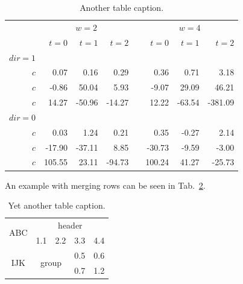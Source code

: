 \begin{table}[!htb]
  \caption{Another table caption.}
  \label{tab:multipleColumns}
  \centering
  \renewcommand{\arraystretch}{1.2} %
  \begin{tabular}{@{}rrrrcrrr@{}} %
    \toprule
      & \multicolumn{3}{c}{$w = 2$} & \phantom{abc} & \multicolumn{3}{c}{$w = 4$} \\
    \cmidrule{2-4}
    \cmidrule{6-8}
      & $t=0$ & $t=1$ & $t=2$ && $t=0$ & $t=1$ & $t=2$ \\
    \midrule
      $dir=1$
      \\
      $c$ &  0.07 &  0.16 &  0.29 &&  0.36 &  0.71 &   3.18 \\
      $c$ & -0.86 & 50.04 &  5.93 && -9.07 & 29.09 &  46.21 \\
      $c$ & 14.27 &-50.96 &-14.27 && 12.22 &-63.54 &-381.09 \\
      $dir=0$
      \\
      $c$ &  0.03 &  1.24 &  0.21 &&  0.35 & -0.27 &  2.14 \\
      $c$ &-17.90 &-37.11 &  8.85 &&-30.73 & -9.59 & -3.00 \\
      $c$ &105.55 & 23.11 &-94.73 &&100.24 & 41.27 &-25.73 \\
    \bottomrule
  \end{tabular}
\end{table}

An example with merging rows can be seen in Tab.~\ref{tab:multipleRows}.

\begin{table}[!htb]
  \caption{Yet another table caption.}
  \label{tab:multipleRows}
  \renewcommand{\arraystretch}{1.2} %
  \centering
  \begin{tabular}{ccccc}
    \toprule
      \multirow{2}{*}{ABC} & \multicolumn{4}{c}{header} \\
      \cmidrule{2-5} & 1.1 & 2.2 & 3.3 & 4.4 \\
    \midrule
      \multirow{2}{*}{IJK} & \multicolumn{2}{c}{\multirow{2}{*}{group}} & 0.5 & 0.6 \\
      \cmidrule{4-5}       & \multicolumn{2}{c}{}                       & 0.7 & 1.2 \\
    \bottomrule
  \end{tabular}
\end{table}

